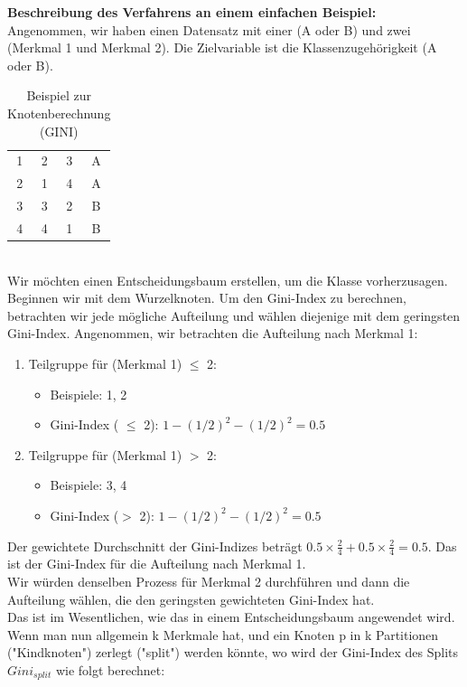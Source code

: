 \documentclass[12pt]{article}
\begin{document}
\textbf{Beschreibung des Verfahrens an einem einfachen Beispiel:}\\
%
Angenommen, wir haben einen Datensatz mit einer {\color{red}{Klassenzughörigkeit}} (A oder B) und zwei {\color{blue}{Merkmalen}} (Merkmal 1 und Merkmal 2). Die Zielvariable ist die Klassenzugehörigkeit (A oder B). 
%
\begin{table}[h]
\centering
  \caption{Beispiel zur Knotenberechnung (GINI)}
  \label{tab:Beispiel-Tabelle}
\begin{tabular}{|c|c|c|c|}
\hline
\color{black}{Beispiel} & \color{blue}{Merkmal 1} & \color{blue}{Merkmal 2} & \color{red}{Klasse} \\
\hline
1 & 2 & 3 & A \\
2 & 1 & 4 & A \\
3 & 3 & 2 & B \\
4 & 4 & 1 & B \\
\hline
\end{tabular}
\end{table}\\[0.3cm]
%
Wir möchten einen Entscheidungsbaum erstellen, um die Klasse vorherzusagen. Beginnen wir mit dem Wurzelknoten. Um den Gini-Index zu berechnen, betrachten wir jede mögliche Aufteilung und wählen diejenige mit dem geringsten Gini-Index.
%
Angenommen, wir betrachten die Aufteilung nach Merkmal 1:
%
\begin{enumerate}
    \item Teilgruppe für (Merkmal 1) $\leq$ 2:
        \begin{itemize}
            \item Beispiele: 1, 2
            \item Gini-Index ( $\leq$ 2): $1 - (1/2)^2 - (1/2)^2 = 0.5$
        \end{itemize}
    \item Teilgruppe für (Merkmal 1) $ > $ 2:
        \begin{itemize}
            \item Beispiele: 3, 4
            \item Gini-Index ($>$ 2): $1 - (1/2)^2 - (1/2)^2 = 0.5$
        \end{itemize}
\end{enumerate}
%
Der gewichtete Durchschnitt der Gini-Indizes beträgt $0.5 \times \frac{2}{4} + 0.5 \times \frac{2}{4} = 0.5$. Das ist der Gini-Index für die Aufteilung nach Merkmal 1.\\[0.2cm]
Wir würden denselben Prozess für Merkmal 2 durchführen und dann die Aufteilung wählen, die den geringsten gewichteten Gini-Index hat.\\
Das ist im Wesentlichen, wie das {\color{blue}{Gini-Index Verfahren}} in einem Entscheidungsbaum angewendet wird.\\[0.4cm]
Wenn man nun allgemein k Merkmale hat, und ein Knoten p in k Partitionen ("Kindknoten") zerlegt ("split") werden könnte, wo wird der Gini-Index des Splits $Gini_{split}$ wie folgt berechnet:
\end{document}
